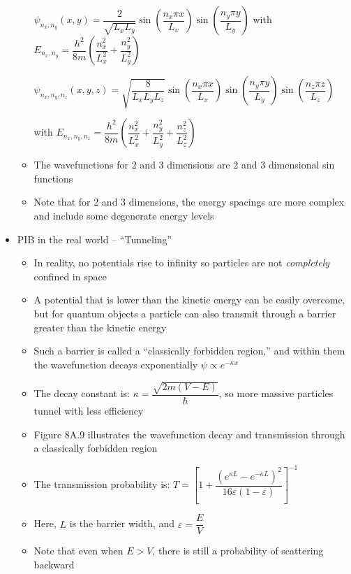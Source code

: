 \documentclass[12pt, openany, letterpaper]{memoir}
\begin{document}
\begin{itemize}
\begin{itemize}
		 $\psi_{n_x,n_y}(x,y) =\dfrac{2}{\sqrt{L_xL_y}}\sin\left(\dfrac{n_x\pi x}{L_x}\right)\sin\left(\dfrac{n_y\pi y}{L_y}\right)$ with $E_{n_x,n_y}=\dfrac{h^2}{8m}\left(\dfrac{n_x^2}{L_x^2}+\dfrac{n_y^2}{L_y^2}\right)$
		 
		 $\psi_{n_x,n_y,n_z}(x,y,z) =\sqrt{\dfrac{8}{L_xL_yL_z}}\sin\left(\dfrac{n_x\pi x}{L_x}\right)\sin\left(\dfrac{n_y\pi y}{L_y}\right)\sin\left(\dfrac{n_z\pi z}{L_z}\right)$
		 
		 with $E_{n_x,n_y,n_z}=\dfrac{h^2}{8m}\left(\dfrac{n_x^2}{L_x^2}+\dfrac{n_y^2}{L_y^2}+\dfrac{n_z^2}{L_z^2}\right)$
		 \item The wavefunctions for 2 and 3 dimensions are 2 and 3 dimensional sin functions
		 \item Note that for 2 and 3 dimensions, the energy spacings are more complex and include some degenerate energy levels		 
	\end{itemize}
	\item PIB in the real world -- “Tunneling”
	\begin{itemize}
		\item In reality, no potentials rise to infinity so particles are not \emph{completely} confined in space
		\item A potential that is lower than the kinetic energy can be easily overcome, but for quantum objects a particle can also transmit through a barrier greater than the kinetic energy
		\item Such a barrier is called a “classically forbidden region,” and within them the wavefunction decays exponentially $\psi\propto e^{-\kappa x}$
		\item The decay constant is: $\kappa = \dfrac{\sqrt{2m(V-E)}}{\hbar}$, so more massive particles tunnel with less efficiency
		\item Figure 8A.9 illustrates the wavefunction decay and transmission through a classically forbidden region
		\item The transmission probability is: $T=\left[1+\dfrac{\left(e^{\kappa L}-e^{-\kappa L}\right)^2}{16\varepsilon(1-\varepsilon)}\right]^{-1}$
		\item Here, $L$ is the barrier width, and $\varepsilon=\dfrac{E}{V}$
		\item Note that even when $E>V$, there is still a probability of scattering backward
	\end{itemize}
\end{itemize}
\end{document}
